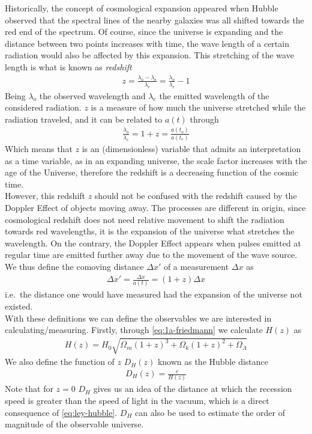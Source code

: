 Historically, the concept of cosmological expansion appeared when Hubble observed that the spectral lines of the nearby galaxies was all shifted towards the red end of the spectrum. Of course, since the universe is expanding and the distance between two points increases with time, the wave length of a certain radiation would also be affected by this expansion. This stretching of the wave length is what is known as \textit{redshift} 
\begin{align}
	z = \frac{\lambda_{\text{o}} - \lambda_{\text{e}}}{\lambda_{\text{e}}} = \frac{\lambda_o}{\lambda_e} - 1
	\label{eq:redshift}
\end{align}
Being $\lambda_o$ the observed wavelength and $\lambda_e$ the emitted wavelength of the considered radiation. $z$ is a measure of how much the universe stretched while the radiation traveled, and it can be related to $a(t)$ through 
\begin{align}
	\frac{\lambda_o}{\lambda_e} = 1+z = \frac{a(t_o)}{a(t_e)}
\end{align}
Which means that $z$ is an (dimensionless) variable that admits an interpretation as a time variable, as in an expanding universe, the scale factor increases with the age of the Universe, therefore the redshift is a decreasing function of the cosmic time. \\

However, this redshift $z$ should not be confused with the redshift caused by the Doppler Effect of objects moving away. The processes are different in origin, since cosmological redshift does not need relative movement to shift the radiation towards red wavelengths, it is the expansion of the universe what stretches the wavelength. On the contrary, the Doppler Effect appears when pulses emitted at regular time are emitted further away due to the movement of the wave source. \\

We thus define the comoving distance $\Delta x'$ of a measurement $\Delta x$ as 
\begin{align}
	\Delta x' =\frac{\Delta x}{a(t)}= (1+z)\Delta x
\end{align}
i.e.\ the distance one would have measured had the expansion of the universe not existed. \\

With these definitions we can define  the observables we are interested in calculating/measuring. Firstly, through \eqref{eq:1a-friedmann} we calculate $H(z)$ as  
\begin{align}
	H(z) = H_0 \sqrt{\Omega_m(1+z)^3 + \Omega_k(1+z)^2 + \Omega_\Lambda} 
\end{align}
We also define the function of $z$ $D_H(z)$ known as the Hubble distance
\begin{align}
	D_H(z)  = \frac{c}{H(z)}
	\label{eq:DH-definition}
\end{align}
Note that for $z = 0$ $D_H$ gives us an idea of the distance at which the recession speed is greater than the speed of light in the vacuum, which is a direct consequence of \eqref{eq:ley-hubble}. $D_H$ can also be used to estimate the order of magnitude of the observable universe. \\

